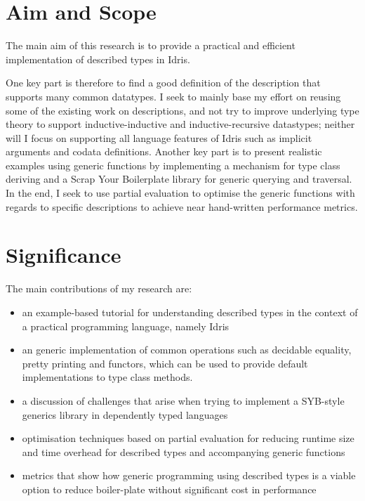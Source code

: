 \documentclass{ituthesis}
\begin{document}
\section{Aim and Scope}
\label{sec:AimandScope}
The main aim of this research is to provide a practical and efficient implementation of described types in Idris.

One key part is therefore to find a good definition of the description that supports many common datatypes.
I seek to mainly base my effort on reusing some of the existing work on descriptions, and not try to improve underlying type theory to support inductive-inductive and inductive-recursive datastypes; neither will I focus on supporting all language features of Idris such as implicit arguments and codata definitions.
Another key part is to present realistic examples using generic functions by implementing a mechanism for type class deriving and a Scrap Your Boilerplate library for generic querying and traversal.
In the end, I seek to use partial evaluation to optimise the generic functions with regards to specific descriptions to achieve near hand-written performance metrics. %

\section{Significance}
\label{sec:Significance}
The main contributions of my research are:

\begin{itemize}
  \item an example-based tutorial for understanding described types in the context of a practical programming language, namely Idris
  \item an generic implementation of common operations such as decidable equality, pretty printing and functors, which can be used to provide default implementations to type class methods.
  \item a discussion of challenges that arise when trying to implement a SYB-style generics library in dependently typed languages
  \item optimisation techniques based on partial evaluation for reducing runtime size and time overhead for described types and accompanying generic functions
  \item metrics that show how generic programming using described types is a viable option to reduce boiler-plate without significant cost in performance
\end{itemize}
\end{document}
